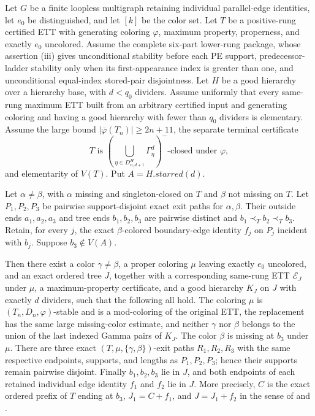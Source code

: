 \begin{lemma}
Let $G$ be a finite loopless multigraph retaining individual parallel-edge
identities, let $e_0$ be distinguished, and let $[k]$ be the color set.
Let $T$ be a positive-rung certified ETT with generating coloring
$\varphi$, maximum property, properness, and exactly $e_0$ uncolored.
Assume the complete six-part lower-rung package, whose assertion (iii) gives
unconditional stability before each PE support, predecessor-ladder stability
only when its first-appearance index is greater than one, and unconditional
equal-index stored-pair disjointness.  Let $H$ be a good
hierarchy over a hierarchy base, with $d<q_0$ dividers.  Assume uniformly
that every same-rung maximum ETT built from an arbitrary certified input
and generating coloring and having a good hierarchy with fewer than
$q_0$ dividers is elementary.  Assume the large bound
$|\overline\varphi(T_n)|\geq2n+11$, the separate terminal certificate
\[
 T\text{ is }
 \left(\bigcup_{\eta\in D^H_{n,d+1}}\Gamma^d_\eta\right)^-
 \text{-closed under }\varphi,
\]
and elementarity of $V(T)$.  Put $A=H.\mathit{starred}(d)$.

Let $\alpha\ne\beta$, with $\alpha$ missing and singleton-closed on $T$
and $\beta$ not missing on $T$.  Let $P_1,P_2,P_3$ be pairwise
support-disjoint exact exit paths for $\alpha,\beta$.  Their outside ends
$a_1,a_2,a_3$ and tree ends $b_1,b_2,b_3$ are pairwise distinct and
$b_1\prec_T b_2\prec_T b_3$.  Retain, for every $j$, the exact
$\beta$-colored boundary-edge identity $f_j$ on $P_j$ incident with
$b_j$.  Suppose $b_3\notin V(A)$.

Then there exist a color $\gamma\ne\beta$, a proper coloring $\mu$
leaving exactly $e_0$ uncolored, and an exact ordered tree $J$, together
with a corresponding same-rung ETT $\mathcal E_J$ under $\mu$, a
maximum-property certificate, and a good hierarchy $K_J$ on $J$ with
exactly $d$ dividers, such that the following all hold.
The coloring $\mu$ is $(T_n,D_n,\varphi)$-stable and is a mod-coloring of
the original ETT, the replacement has the
same large missing-color estimate, and neither $\gamma$ nor $\beta$
belongs to the union of the last indexed Gamma pairs of $K_J$.
The color $\beta$ is missing at $b_3$ under $\mu$.  There are three exact
$(T,\mu,\{\gamma,\beta\})$-exit paths $R_1,R_2,R_3$ with the same
respective endpoints, supports, and lengths as $P_1,P_2,P_3$; hence their
supports remain pairwise disjoint.  Finally $b_1,b_2,b_3$ lie in $J$, and
both endpoints of each retained individual edge identity $f_1$ and $f_2$
lie in $J$.  More precisely, $C$ is the exact ordered prefix of $T$
ending at $b_3$, $J_1=C+f_1$, and $J=J_1+f_2$ in the sense of
 and
.
\end{lemma}
